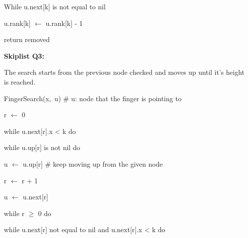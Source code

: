 \documentclass[12pt]{article}
\renewcommand{\_}{\kern-1.5pt\textunderscore\kern-1.5pt}
\begin{document}
\begin{adjustwidth}{0.5in}{0.0in}
While u.next[k] is not equal to nil\par

\end{adjustwidth}

\begin{adjustwidth}{0.5in}{0.0in}
\tab u.rank[k] $ \leftarrow $  u.rank[k] - 1\par

\end{adjustwidth}

\begin{adjustwidth}{0.5in}{0.0in}
return removed \par

\end{adjustwidth}


\vspace{\baselineskip}
\textbf{Skiplist Q3:}\par


\vspace{\baselineskip}
The search starts from the previous node checked and moves up until it’s height is reached.\par


\vspace{\baselineskip}
FingerSearch(x,\ u)  $\#$  u: node that the finger is pointing to\par

r $ \leftarrow $  0\par

while u.next[r].x < k do \par

\begin{adjustwidth}{0.5in}{0.0in}
 while u.up[r] is not nil do\par

\end{adjustwidth}

\tab \tab u $ \leftarrow $  u.up[r] $\#$ keep moving up from the given node\par

\tab \tab r $ \leftarrow $  r + 1\par

\tab u $ \leftarrow $  u.next[r]\par

while r $ \geq $  0 do \par

\begin{adjustwidth}{0.5in}{0.0in}
while u.next[r] not equal to nil and u.next[r].x < k do \par

\end{adjustwidth}
\end{document}
